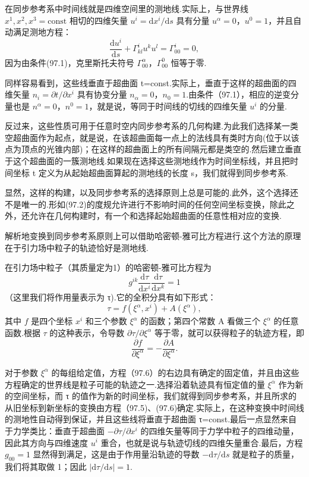 在同步参考系中时间线就是四维空间里的测地线.实际上，与世界线 $x^1,x^2,x^3=\mathrm{const}$ 相切的四维矢量 $u^i=\mathrm{d}x^i/\mathrm{d}s$ 具有分量 $u^{\alpha}=0$，$u^0=1$，并且自动满足测地方程：
\begin{equation*}
  \frac{\mathrm{d}u^i}{\mathrm{d}s}
  +\Gamma^i_{kl}u^ku^l=\Gamma^i_{00}=0,
\end{equation*}
因为由条件(97.1)，克里斯托夫符号 $\Gamma^{\alpha}_{00}$，$\Gamma^0_{00}$ 恒等于零.

同样容易看到，这些线垂直于超曲面 t=const.实际上，垂直于这样的超曲面的四维矢量 $n_i=\partial t/\partial x^i$ 具有协变分量 $n_{\alpha}=0$，$n_0=1$.由条件（97.1），相应的逆变分量也是 $n^{\alpha}=0$，$n^0=1$，就是说，等同于时间线的切线的四维矢量 $u^i$ 的分量.

反过来，这些性质可用于任意时空内同步参考系的几何构建.为此我们选择某一类空超曲面作为起点，就是说，在该超曲面每一点上的法线具有类时方向(位于以该点为顶点的光锥内部)；在这样的超曲面上的所有间隔元都是类空的.然后建立垂直于这个超曲面的一簇测地线.如果现在选择这些测地线作为时间坐标线，并且把时间坐标 t 定义为从起始超曲面算起的测地线的长度 s，我们就得到同步参考系.

显然，这样的构建，以及同步参考系的选择原则上总是可能的.此外，这个选择还不是唯一的.形如(97.2)的度规允许进行不影响时间的任何空间坐标变换，除此之外，还允许在几何构建时，有一个和选择起始超曲面的任意性相对应的变换.

解析地变换到同步参考系原则上可以借助哈密顿-雅可比方程进行.这个方法的原理在于引力场中粒子的轨迹恰好是测地线.

在引力场中粒子（其质量定为1）的哈密顿-雅可比方程为
\begin{equation}
  g^{ik}\frac{\mathrm{d}\tau}{\mathrm{d}x^i}
  \frac{\mathrm{d}\tau}{\mathrm{d}x^k}=1
\end{equation}
（这里我们将作用量表示为 τ).它的全积分具有如下形式：
\begin{equation}
  \tau=f(\xi^{\alpha},x^i)+A(\xi^{\alpha}),
\end{equation}
其中 $f$ 是四个坐标 $x^i$ 和三个参数 $\xi^{\alpha}$ 的函数；第四个常数 A 看做三个 $\xi^{\alpha}$ 的任意函数.根据 $\tau$ 的这种表示，令导数 $\partial\tau/\partial\xi^{\alpha}$ 等于零，就可以获得粒子的轨迹方程，即
\begin{equation}
  \frac{\partial f}{\partial\xi^{\alpha}}
  =-\frac{\partial A}{\partial\xi^{\alpha}}.
\end{equation}

对于参数 $\xi^{\alpha}$ 的每组给定值，方程（97.6）的右边具有确定的固定值，并且由这些方程确定的世界线是粒子可能的轨迹之一.选择沿着轨迹具有恒定值的量 $\xi^{\alpha}$ 作为新的空间坐标，而 τ 的值作为新的时间坐标，我们就得到同步参考系，并且所求的从旧坐标到新坐标的变换由方程（97.5)、(97.6)确定.实际上，在这种变换中时间线的测地性自动得到保证，并且这些线将垂直于超曲面 τ=const.最后一点显然来自于力学类比：垂直于超曲面 $-\partial\tau/\partial x^i$ 的四维矢量等同于力学中粒子的四维动量，因此其方向与四维速度 $u^i$ 重合，也就是说与轨迹切线的四维矢量重合.最后，方程 $g_{00}=1$ 显然得到满足，这是由于作用量沿轨迹的导数 $-\mathrm{d}\tau/\mathrm{d}s$ 就是粒子的质量，我们将其取做 1；因此 $|\mathrm{d}\tau/\mathrm{d}s|=1$.

